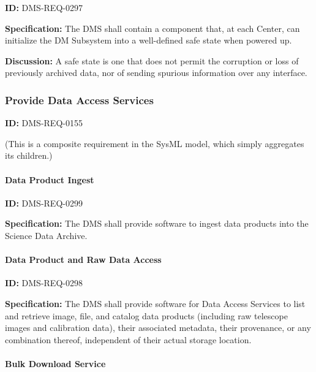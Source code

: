 \documentclass[SE,toc,lsstdraft]{lsstdoc}
\begin{document}
\label{DMS-REQ-0297}
\textbf{ID:} DMS-REQ-0297

\textbf{Specification:} The DMS shall contain a component that, at each Center, can initialize the DM Subsystem into a well-defined safe state when powered up.

\textbf{Discussion: }A safe state is one that does not permit the corruption or loss of previously archived data, nor of sending spurious information over any interface.




\subsubsection{Provide Data Access Services}

\label{DMS-REQ-0155}
\textbf{ID:} DMS-REQ-0155



(This is a composite requirement in the SysML model, which simply aggregates its children.)




\paragraph{Data Product Ingest}\hfill  %

\label{DMS-REQ-0299}
\textbf{ID:} DMS-REQ-0299

\textbf{Specification:} The DMS shall provide software to ingest data products into the Science Data Archive.






\paragraph{Data Product and Raw Data Access}\hfill  %

\label{DMS-REQ-0298}
\textbf{ID:} DMS-REQ-0298

\textbf{Specification:} The DMS shall provide software for Data Access Services to list and retrieve image, file, and catalog data products (including raw telescope images and calibration data), their associated metadata, their provenance, or any combination thereof, independent of their actual storage location.







\paragraph{Bulk Download Service}\hfill  %
\end{document}
